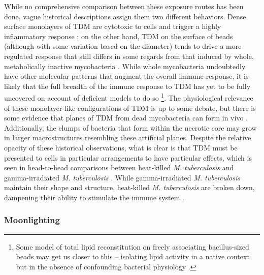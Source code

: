 While no comprehensive comparison between these exposure routes has been done, vague historical descriptions assign them two different behaviors. Dense surface monolayers of TDM are cytotoxic to cells and trigger a highly inflammatory response \citep{Retzinger1982, Schabbing1994, Hunter2006a, Welsh2013}; on the other hand, TDM on the surface of beads (although with some variation based on the diameter) tends to drive a more regulated response that still differs in some regards from that induced by whole, metabolically inactive mycobacteria \citep{Bowdish2009, Welsh2013}. While whole mycobacteria undoubtedly have other molecular patterns that augment the overall immune response, it is likely that the full breadth of the immune response to TDM has yet to be fully uncovered on account of deficient models to do so \footnote{Some model of total lipid reconstitution on freely associating bacillus\hyp{}sized beads may get us closer to this -- isolating lipid activity in a native context but in the absence of confounding bacterial physiology \citep{Rhoades2003}.}. The physiological relevance of these monolayer\hyp{}like configurations of TDM is up to some debate, but there is some evidence that planes of TDM from dead mycobacteria can form in vivo \citep{Hunter2006b, Glickman2008, Schabbing1994}. Additionally, the clumps of bacteria that form within the necrotic core may grow in larger macrostructures resembling these artificial planes. Despite the relative opacity of these historical observations, what is clear is that TDM must be presented to cells in particular arrangements to have particular effects, which is seen in head\hyp{}to\hyp{}head comparisons between heat\hyp{}killed \textit{M. tuberculosis} and gamma\hyp{}irradiated \textit{M. tuberculosis} \citep{Mosavari2021, Cha2015, Yang2018, Gleeson2016, Datta2006, Krokowski2018}. While gamma\hyp{}irradiated \textit{M. tuberculosis} maintain their shape and structure, heat\hyp{}killed \textit{M. tuberculosis} are broken down, dampening their ability to stimulate the immune system \citep{SecanellaFandos2014, Carpenter1959}. 

\subsubsection{Moonlighting}\label{moon}

